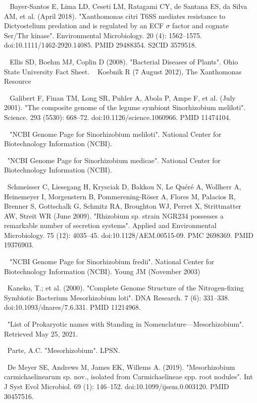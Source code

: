 \documentclass[11pt]{article}
\begin{document}
\begin{thebibliography}{3}
	~ Bayer-Santos E, Lima LD, Ceseti LM, Ratagami CY, de Santana ES, da Silva AM, et al. (April 2018). "Xanthomonas citri T6SS mediates resistance to Dictyostelium predation and is regulated by an ECF $\sigma$ factor and cognate Ser/Thr kinase". Environmental Microbiology. 20 (4): 1562–1575. doi:10.1111/1462-2920.14085. PMID 29488354. S2CID 3579518.
	
	~ Ellis SD, Boehm MJ, Coplin D (2008). "Bacterial Diseases of Plants". Ohio State University Fact Sheet.
	~ Koebnik R (7 August 2012), The Xanthomonas Resource
	
	~  Galibert F, Finan TM, Long SR, Puhler A, Abola P, Ampe F, et al. (July 2001). "The composite genome of the legume symbiont Sinorhizobium meliloti". Science. 293 (5530): 668–72. doi:10.1126/science.1060966. PMID 11474104.
	
	~ "NCBI Genome Page for Sinorhizobium meliloti". National Center for Biotechnology Information (NCBI).

	~"NCBI Genome Page for Sinorhizobium medicae". National Center for Biotechnology Information (NCBI).
	
	~Schmeisser C, Liesegang H, Krysciak D, Bakkou N, Le Quéré A, Wollherr A, Heinemeyer I, Morgenstern B, Pommerening-Röser A, Flores M, Palacios R, Brenner S, Gottschalk G, Schmitz RA, Broughton WJ, Perret X, Strittmatter AW, Streit WR (June 2009). "Rhizobium sp. strain NGR234 possesses a remarkable number of secretion systems". Applied and Environmental Microbiology. 75 (12): 4035–45. doi:10.1128/AEM.00515-09. PMC 2698369. PMID 19376903.
	
	~ "NCBI Genome Page for Sinorhizobium fredii". National Center for Biotechnology Information (NCBI).
	Young JM (November 2003)
	
	~Kaneko, T.; et al. (2000). "Complete Genome Structure of the Nitrogen-fixing Symbiotic Bacterium Mesorhizobium loti". DNA Research. 7 (6): 331–338. doi:10.1093/dnares/7.6.331. PMID 11214968.
	
	~"List of Prokaryotic names with Standing in Nomenclature—Mesorhizobium". Retrieved May 25, 2021.
	
	~Parte, A.C. "Mesorhizobium". LPSN.
	
	~De Meyer SE, Andrews M, James EK, Willems A. (2019). "Mesorhizobium carmichaelinearum sp. nov., isolated from Carmichaelineae spp. root nodules". Int J Syst Evol Microbiol. 69 (1): 146–152. doi:10.1099/ijsem.0.003120. PMID 30457516.
	

\end{thebibliography}
\end{document}
